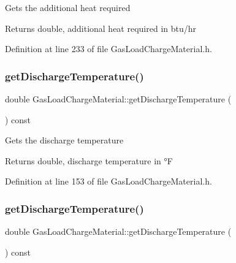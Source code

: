 Gets the additional heat required

\begin{DoxyReturn}{Returns}
double, additional heat required in btu/hr 
\end{DoxyReturn}


Definition at line 233 of file Gas\+Load\+Charge\+Material.\+h.

\mbox{\label{class_gas_load_charge_material_a6baaf6ad65e2a3d1fa90b7c007bc3c53}} 
\subsubsection{\texorpdfstring{get\+Discharge\+Temperature()}{getDischargeTemperature()}\hspace{0.1cm}{\footnotesize\ttfamily [1/3]}}
{\footnotesize\ttfamily double Gas\+Load\+Charge\+Material\+::get\+Discharge\+Temperature (\begin{DoxyParamCaption}{ }\end{DoxyParamCaption}) const\hspace{0.3cm}{\ttfamily [inline]}}

Gets the discharge temperature

\begin{DoxyReturn}{Returns}
double, discharge temperature in °F 
\end{DoxyReturn}


Definition at line 153 of file Gas\+Load\+Charge\+Material.\+h.

\mbox{\label{class_gas_load_charge_material_a6baaf6ad65e2a3d1fa90b7c007bc3c53}} 
\subsubsection{\texorpdfstring{get\+Discharge\+Temperature()}{getDischargeTemperature()}\hspace{0.1cm}{\footnotesize\ttfamily [2/3]}}
{\footnotesize\ttfamily double Gas\+Load\+Charge\+Material\+::get\+Discharge\+Temperature (\begin{DoxyParamCaption}{ }\end{DoxyParamCaption}) const\hspace{0.3cm}{\ttfamily [inline]}}

